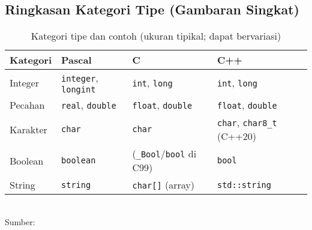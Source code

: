 \documentclass[../main.tex]{subfiles}
\begin{document}
\subsection{Ringkasan Kategori Tipe (Gambaran Singkat)}
\begin{table}[H]
  \centering
  \caption{Kategori tipe dan contoh (ukuran tipikal; dapat bervariasi)}
  \begin{tabular}{@{}llll@{}}
    \toprule
    Kategori & Pascal & C & C++ \\
    \midrule
    Integer & \texttt{integer}, \texttt{longint} & \texttt{int}, \texttt{long} & \texttt{int}, \texttt{long} \\
    Pecahan & \texttt{real}, \texttt{double} & \texttt{float}, \texttt{double} & \texttt{float}, \texttt{double} \\
    Karakter & \texttt{char} & \texttt{char} & \texttt{char}, \texttt{char8\_t} (C++20) \\
    Boolean & \texttt{boolean} & (\texttt{\_Bool}/\texttt{bool} di C99) & \texttt{bool} \\
    String & \texttt{string} & \texttt{char[]} (array) & \texttt{std::string} \\
    \bottomrule
  \end{tabular}
  \\Sumber: \parencite{free-pascal-docs,iso-c-draft-n1570,cpp-fundamental-types}
\end{table}
\end{document}
